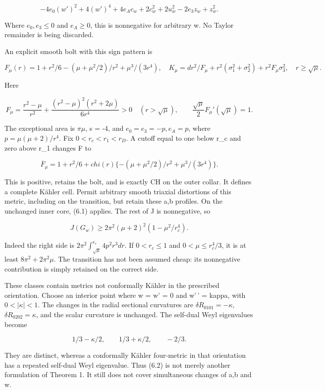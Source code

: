 \documentclass[
  10pt,
]{article}
\begin{document}
\[
 \boxed{-4e_0(w')^2+4(w')^4+4e_Ac_w+2c_w^2+2u_w^2
                         -2e_3z_w+z_w^2.}                       \tag{6.1}
\]

Where \(e_0,e_3\le0\) and \(e_A\ge0\), this is nonnegative for arbitrary
w. No Taylor remainder is being discarded.

An explicit smooth bolt with this sign pattern is

\[
 F_\mu(r)=1+r^2/6-(\mu+\mu^2/2)/r^2+\mu^3/(3r^4),
 \quad K_\mu=dr^2/F_\mu+r^2(\sigma_1^2+\sigma_2^2)
                         +r^2F_\mu\sigma_3^2,\quad r\ge\sqrt\mu.
\]

Here

\[
 F_\mu=\frac{r^2-\mu}{r^2}
       +\frac{(r^2-\mu)^2(r^2+2\mu)}{6r^4}>0\quad(r>\sqrt\mu),
 \qquad \frac{\sqrt\mu}{2}F_\mu'(\sqrt\mu)=1.
\]

The exceptional area is \(\pi\mu\), s = -4, and \(e_0=e_3=-p,e_A=p\),
where \(p=\mu(\mu+2)/r^4\). Fix \(0<r_c<r_1<r_D\). A cutoff equal to one
below r\_c and zero above r\_1 changes F to

\[
 \overline F_\mu=1+r^2/6+chi(r)
                  \{- (\mu+\mu^2/2)/r^2+\mu^3/(3r^4)\}.
\]

This is positive, retains the bolt, and is exactly CH on the outer
collar. It defines a complete Kähler cell. Permit arbitrary smooth
triaxial distortions of this metric, including on the transition, but
retain these a,b profiles. On the unchanged inner core, (6.1) applies.
The rest of J is nonnegative, so

\[
 \boxed{J(G_w)\ge2\pi^2(\mu+2)^2(1-\mu^2/r_c^4).}               \tag{6.2}
\]

Indeed the right side is \(2\pi^2\int_{\sqrt\mu}^{r_c}4p^2r^3dr\). If
\(0<r_c\le1\) and \(0<\mu\le r_c^4/3\), it is at least
\(8\pi^2+2\pi^2\mu\). The transition has not been assumed cheap: its
nonnegative contribution is simply retained on the correct side.

These classes contain metrics not conformally Kähler in the prescribed
orientation. Choose an interior point where w = w' = 0 and w'\,' =
kappa, with \(0<|\kappa|<1\). The changes in the radial sectional
curvatures are \(\delta R_{0101}=-\kappa\), \(\delta R_{0202}=\kappa\),
and the scalar curvature is unchanged. The self-dual Weyl eigenvalues
become

\[
       1/3-\kappa/2,\qquad 1/3+\kappa/2,\qquad -2/3.
\]

They are distinct, whereas a conformally Kähler four-metric in that
orientation has a repeated self-dual Weyl eigenvalue. Thus (6.2) is not
merely another formulation of Theorem 1. It still does not cover
simultaneous changes of a,b and w.
\end{document}
